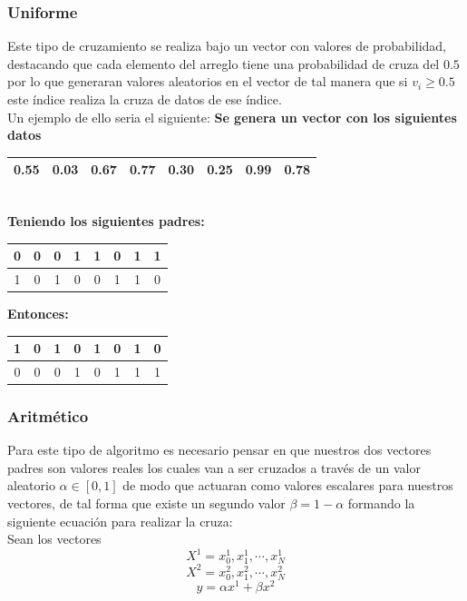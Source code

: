 \documentclass[10pt]{article}
\begin{document}
\subsubsection{Uniforme}
Este tipo de cruzamiento se realiza bajo un vector con valores de probabilidad, destacando que cada elemento del arreglo tiene una probabilidad de cruza del $0.5$ por lo que generaran valores aleatorios en el vector de tal manera que si $v_{i}\geq 0.5$ este índice realiza la cruza de datos de ese índice.\\Un ejemplo de ello seria el siguiente:
\textbf{Se genera un vector con los siguientes datos}
\begin{center}
  \begin{tabular}{|c|c|c|c|c|c|c|c|}
    \hline
    0.55 & 0.03 & 0.67 & 0.77 & 0.30 & 0.25 & 0.99 & 0.78 \\
    \hline
  \end{tabular}
  \\\vspace{0.25cm}
  \textbf{Teniendo los siguientes padres:}\\
  \begin{tabular}{|c|c|c|c|c|c|c|c|}
    \hline
    \color{blue}0&\color{blue}0&\color{blue}0&\color{blue}1&\color{blue}1&\color{blue}0&\color{blue}1&\color{blue}1\\
    \hline
    \color{red}1&\color{red}0&\color{red}1&\color{red}0&\color{red}0&\color{red}1&\color{red}1&\color{red}0\\
    \hline
  \end{tabular}
  \textbf{Entonces:}
  \begin{tabular}{|c|c|c|c|c|c|c|c|}
    \hline
    \color{red}1 & \color{blue}0 & \color{red}1 & \color{red}0  & \color{blue}1 & \color{blue}0 & \color{red}1&\color{red}0\\
    \hline
    \color{blue}0 & \color{red}0 & \color{blue}0 & \color{blue}1  & \color{red}0 & \color{red}1 & \color{blue}1&\color{blue}1\\
    \hline
  \end{tabular}
\end{center}
\subsubsection{Aritmético}
Para este tipo de algoritmo es necesario pensar en que nuestros dos vectores padres son valores reales los cuales van a ser cruzados a través de un valor aleatorio $\alpha\in[0,1]$ de modo que actuaran como valores escalares para nuestros vectores, de tal forma que existe un segundo valor $\beta=1-\alpha$ formando la siguiente ecuación para realizar la cruza:\\\vspace{0.25cm}
Sean los vectores \\
\[\displaystyle X^{1}={x_0^{1},x_1^{1},\cdots,x_N^{1}}\] \[\displaystyle X^{2}={x_0^{2},x_1^{2},\cdots,x_N^{2}}\]
\[y=\alpha x^{1}+\beta x^{2}\]
\end{document}
